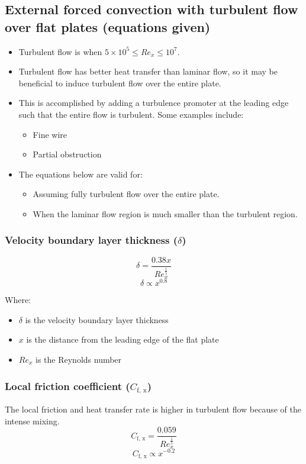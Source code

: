 \documentclass[11pt]{article}
\begin{document}
\subsection{External forced convection with turbulent flow over flat plates (equations given)}
\label{sec:orgf30f69a}
\begin{itemize}
\item Turbulent flow is when \(5 \times 10^5 \le Re_x \le 10^7\).
\item Turbulent flow has better heat transfer than laminar flow, so it may be beneficial to induce turbulent flow over the entire plate.
\item This is accomplished by adding a turbulence promoter at the leading edge such that the entire flow is turbulent. Some examples include:
\begin{itemize}
\item Fine wire
\item Partial obstruction
\end{itemize}
\item The equations below are valid for:
\begin{itemize}
\item Assuming fully turbulent flow over the entire plate.
\item When the laminar flow region is much smaller than the turbulent region.
\end{itemize}
\end{itemize}
\subsubsection{Velocity boundary layer thickness (\(\delta\))}
\label{sec:orgcf69145}
\[\delta = \frac{0.38 x}{Re_x^{\frac{1}{5}}}\]
\[\delta \propto x^{0.8}\]

Where:
\begin{itemize}
\item \(\delta\) is the velocity boundary layer thickness
\item \(x\) is the distance from the leading edge of the flat plate
\item \(Re_x\) is the Reynolds number
\end{itemize}
\subsubsection{Local friction coefficient (\(C_{\text{f, x}}\))}
\label{sec:org1f52522}
The local friction and heat transfer rate is higher in turbulent flow because of the intense mixing.
\[C_{\text{f, x}} = \frac{0.059}{Re_x^{\frac{1}{5}}}\]
\[C_{\text{f, x}} \propto x^{-0.2}\]
\end{document}
